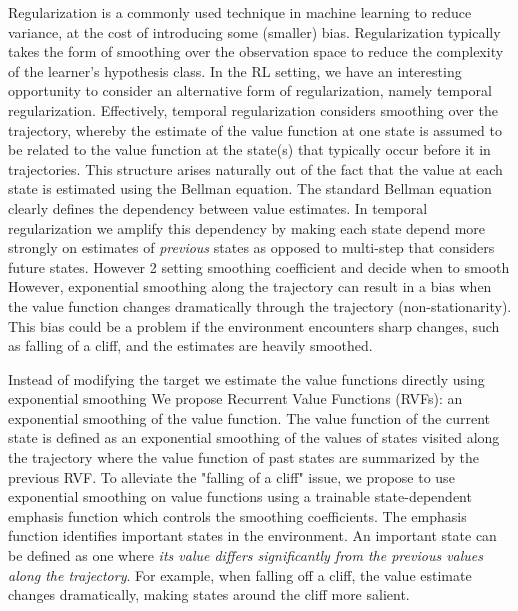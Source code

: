 Regularization is a commonly used technique in machine learning to reduce variance, at the cost of introducing some (smaller) bias.  Regularization typically takes the form of smoothing over the observation space to reduce the complexity of the learner's hypothesis class. In the RL setting, we have an interesting opportunity to consider an alternative form of regularization, namely temporal regularization.  Effectively, temporal regularization considers smoothing over the trajectory, whereby the estimate of the value function at one state is assumed to be related to the value function at the state(s) that typically occur before it in trajectories. This structure arises naturally out of the fact that the value at each state is estimated using the Bellman equation. The standard Bellman equation clearly defines the dependency between value estimates. In temporal regularization we amplify this dependency by making each state depend more strongly on estimates of \emph{previous} states as opposed to multi-step that considers future states.  However 2 setting smoothing coefficient and decide when to smooth
However, exponential smoothing along the trajectory can result in a bias when the value function changes dramatically through the trajectory (non-stationarity). This bias could be a problem if the environment encounters sharp changes, such as falling of a cliff, and the estimates are heavily smoothed.

Instead of modifying the target we estimate the value functions directly using exponential smoothing We propose Recurrent Value Functions (RVFs): an exponential smoothing of the value function. The value function of the current state is defined as an exponential smoothing of the values of states visited along the trajectory where the value function of past states are summarized by the previous RVF. To alleviate the "falling of a cliff" issue, we propose to use exponential smoothing on value functions using a trainable state-dependent emphasis function which controls the smoothing coefficients. The emphasis function identifies important states in the environment. An important state can be defined as one where \emph{its value differs significantly from the previous values along the trajectory}. For example, when falling off a cliff, the value estimate changes dramatically, making states around the cliff more salient.

